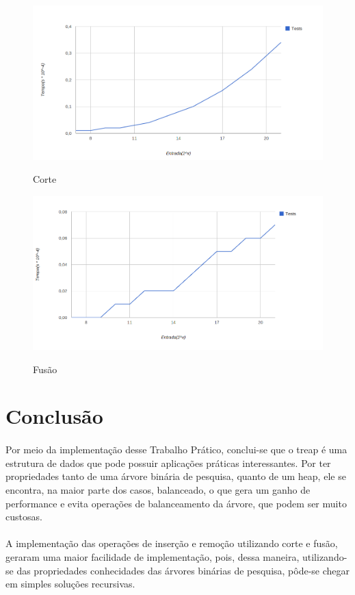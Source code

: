\documentclass[a4paper, 12pt]{article}
\begin{document}
\begin{figure}
\caption{Corte}
 \centering %
\includegraphics[width=15cm]{char_split.png} %
\label{figura:rem}
\end{figure}
\begin{figure}
\caption{Fusão}
 \centering %
\includegraphics[width=15cm]{char_merge.png} %
\label{figura:rem}
\end{figure}

\section{Conclusão}
\paragraph{}
Por meio da implementação desse Trabalho Prático, conclui-se que o treap é uma estrutura de dados que pode possuir aplicações práticas interessantes. Por ter propriedades tanto de uma árvore binária de pesquisa, quanto de um heap, ele se encontra, na maior parte dos casos, balanceado, o que gera um ganho de performance e evita operações de balanceamento da árvore, que podem ser muito custosas.
\paragraph{}
A implementação das operações de inserção e remoção utilizando corte e fusão, geraram uma maior facilidade de implementação, pois, dessa maneira, utilizando-se das propriedades conhecidades das árvores binárias de pesquisa, pôde-se chegar em simples soluções recursivas.
\end{document}
